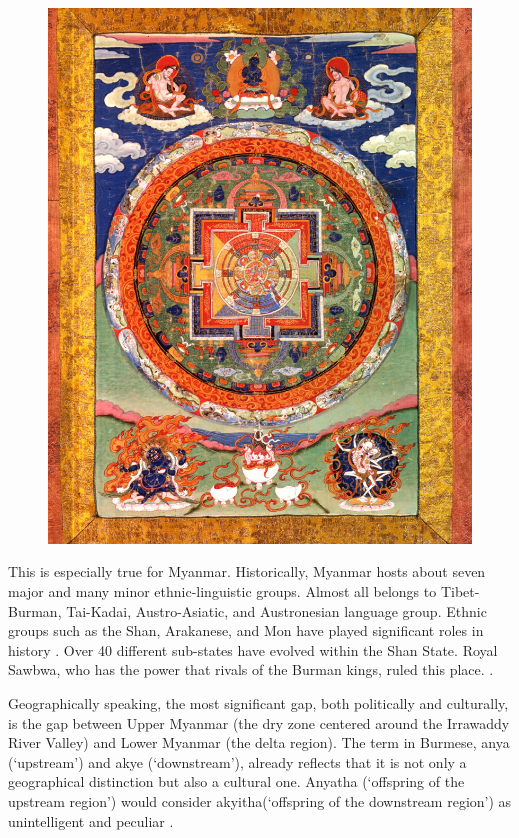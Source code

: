 \documentclass[man,floatsintext]{apa7}
\begin{document}
\begin{figure}[H]
        \centering
        \includegraphics[width=\textwidth]{mandala.png}
        \caption{\cite{MandalaBuddhistDeity1700}}
        \label{mandala}
\end{figure}

This is especially true for Myanmar. Historically, Myanmar hosts about seven major and many minor ethnic-linguistic groups. Almost all belongs to Tibet-Burman, Tai-Kadai, Austro-Asiatic, and Austronesian language group. Ethnic groups such as the Shan, Arakanese, and Mon have played significant roles in history \autocite[p.46-56]{aung-thwinHistoryMyanmarAncient2012}. Over 40 different sub-states have evolved within the Shan State. Royal Sawbwa, who has the power that rivals of the Burman kings, ruled this place. \autocite[18,54]{smithEthnicGroupsBurma1994}.

Geographically speaking, the most significant gap, both politically and culturally, is the gap between Upper Myanmar (the dry zone centered around the Irrawaddy River Valley) and Lower Myanmar (the delta region). The term in Burmese, anya (`upstream') and akye (`downstream'), already reflects that it is not only a geographical distinction but also a cultural one. Anyatha (`offspring of the upstream region') would consider akyitha(`offspring of the downstream region') as unintelligent and peculiar \autocite[43,142]{aung-thwinHistoryMyanmarAncient2012}.
\end{document}
